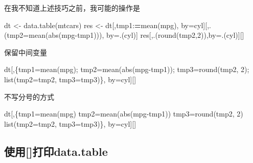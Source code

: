 \documentclass[
]{book}
\newenvironment{Shaded}{\begin{snugshade}}{\end{snugshade}}
\newcommand{\AttributeTok}[1]{\textcolor[rgb]{0.77,0.63,0.00}{#1}}
\newcommand{\DecValTok}[1]{\textcolor[rgb]{0.00,0.00,0.81}{#1}}
\newcommand{\ErrorTok}[1]{\textcolor[rgb]{0.64,0.00,0.00}{\textbf{#1}}}
\newcommand{\FunctionTok}[1]{\textcolor[rgb]{0.00,0.00,0.00}{#1}}
\newcommand{\NormalTok}[1]{#1}
\newcommand{\OtherTok}[1]{\textcolor[rgb]{0.56,0.35,0.01}{#1}}
\newcommand{\SpecialCharTok}[1]{\textcolor[rgb]{0.00,0.00,0.00}{#1}}
\begin{document}
在我不知道上述技巧之前，我可能的操作是

\begin{Shaded}
\begin{Highlighting}[]
\NormalTok{dt }\OtherTok{\textless{}{-}} \FunctionTok{data.table}\NormalTok{(mtcars)}
\NormalTok{res }\OtherTok{\textless{}{-}}\NormalTok{ dt[,tmp1}\SpecialCharTok{:}\ErrorTok{=}\FunctionTok{mean}\NormalTok{(mpg), by}\OtherTok{=}\NormalTok{cyl][,.(}\AttributeTok{tmp2=}\FunctionTok{mean}\NormalTok{(}\FunctionTok{abs}\NormalTok{(mpg}\SpecialCharTok{{-}}\NormalTok{tmp1))), by}\OtherTok{=}\NormalTok{.(cyl)]}
\NormalTok{res[,.(}\FunctionTok{round}\NormalTok{(tmp2,}\DecValTok{2}\NormalTok{)),by}\OtherTok{=}\NormalTok{.(cyl)][]}
\end{Highlighting}
\end{Shaded}

保留中间变量

\begin{Shaded}
\begin{Highlighting}[]
\NormalTok{dt[,\{tmp1}\OtherTok{=}\FunctionTok{mean}\NormalTok{(mpg); tmp2}\OtherTok{=}\FunctionTok{mean}\NormalTok{(}\FunctionTok{abs}\NormalTok{(mpg}\SpecialCharTok{{-}}\NormalTok{tmp1)); tmp3}\OtherTok{=}\FunctionTok{round}\NormalTok{(tmp2, }\DecValTok{2}\NormalTok{); }\FunctionTok{list}\NormalTok{(}\AttributeTok{tmp2=}\NormalTok{tmp2, }\AttributeTok{tmp3=}\NormalTok{tmp3)\}, by}\OtherTok{=}\NormalTok{cyl][]}
\end{Highlighting}
\end{Shaded}

不写分号的方式

\begin{Shaded}
\begin{Highlighting}[]
\NormalTok{dt[,\{tmp1}\OtherTok{=}\FunctionTok{mean}\NormalTok{(mpg)}
\NormalTok{     tmp2}\OtherTok{=}\FunctionTok{mean}\NormalTok{(}\FunctionTok{abs}\NormalTok{(mpg}\SpecialCharTok{{-}}\NormalTok{tmp1))}
\NormalTok{     tmp3}\OtherTok{=}\FunctionTok{round}\NormalTok{(tmp2, }\DecValTok{2}\NormalTok{)}
     \FunctionTok{list}\NormalTok{(}\AttributeTok{tmp2=}\NormalTok{tmp2, }\AttributeTok{tmp3=}\NormalTok{tmp3)\},}
\NormalTok{   by}\OtherTok{=}\NormalTok{cyl][]}
\end{Highlighting}
\end{Shaded}

\hypertarget{ux4f7fux7528ux6253ux5370data.table}{%
\subsection{使用{[}{]}打印data.table}\label{ux4f7fux7528ux6253ux5370data.table}}
\end{document}
